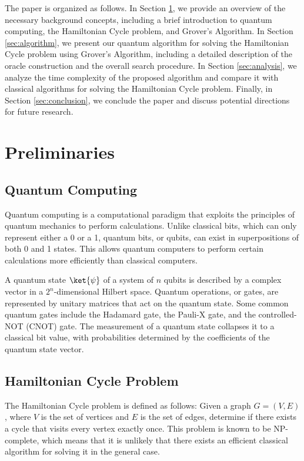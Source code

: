 The paper is organized as follows. In Section \ref{sec:preliminaries}, we provide an overview of the necessary background concepts, including a brief introduction to quantum computing, the Hamiltonian Cycle problem, and Grover's Algorithm. In Section \ref{sec:algorithm}, we present our quantum algorithm for solving the Hamiltonian Cycle problem using Grover's Algorithm, including a detailed description of the oracle construction and the overall search procedure. In Section \ref{sec:analysis}, we analyze the time complexity of the proposed algorithm and compare it with classical algorithms for solving the Hamiltonian Cycle problem. Finally, in Section \ref{sec:conclusion}, we conclude the paper and discuss potential directions for future research.

\section{Preliminaries}
\label{sec:preliminaries}

\subsection{Quantum Computing}

Quantum computing is a computational paradigm that exploits the principles of quantum mechanics to perform calculations. Unlike classical bits, which can only represent either a 0 or a 1, quantum bits, or qubits, can exist in superpositions of both 0 and 1 states. This allows quantum computers to perform certain calculations more efficiently than classical computers.

A quantum state $\ket{\psi}$ of a system of $n$ qubits is described by a complex vector in a $2^n$-dimensional Hilbert space. Quantum operations, or gates, are represented by unitary matrices that act on the quantum state. Some common quantum gates include the Hadamard gate, the Pauli-X gate, and the controlled-NOT (CNOT) gate. The measurement of a quantum state collapses it to a classical bit value, with probabilities determined by the coefficients of the quantum state vector.

\subsection{Hamiltonian Cycle Problem}

The Hamiltonian Cycle problem is defined as follows: Given a graph $G = (V, E)$, where $V$ is the set of vertices and $E$ is the set of edges, determine if there exists a cycle that visits every vertex exactly once. This problem is known to be NP-complete, which means that it is unlikely that there exists an efficient classical algorithm for solving it in the general case.

